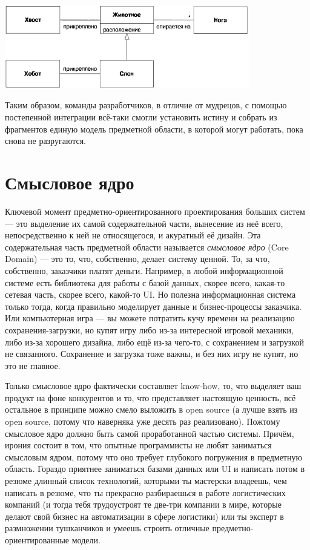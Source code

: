 \documentclass[a5paper]{article}
\begin{document}
\begin{center}
    \includegraphics[width=0.8\textwidth]{elephantSingleBoundedContext.png}
\end{center}

Таким образом, команды разработчиков, в отличие от мудрецов, с помощью постепенной интеграции всё-таки смогли установить истину и собрать из фрагментов единую модель предметной области, в которой могут работать, пока снова не разругаются.

\section{Смысловое ядро}

Ключевой момент предметно-ориентированного проектирования больших систем --- это выделение их самой содержательной части, вынесение из неё всего, непосредственно к ней не относящегося, и акуратный её дизайн. Эта содержательная часть предметной области называется \textit{смысловое ядро} (Core Domain) --- это то, что, собственно, делает систему ценной. То, за что, собственно, заказчики платят деньги. Например, в любой информационной системе есть библиотека для работы с базой данных, скорее всего, какая-то сетевая часть, скорее всего, какой-то UI. Но полезна информационная система только тогда, когда правильно моделирует данные и бизнес-процессы заказчика. Или компьютерная игра --- вы можете потратить кучу времени на реализацию сохранения-загрузки, но купят игру либо из-за интересной игровой механики, либо из-за хорошего дизайна, либо ещё из-за чего-то, с сохранением и загрузкой не связанного. Сохранение и загрузка тоже важны, и без них игру не купят, но это не главное.

Только смысловое ядро фактически составляет know-how, то, что выделяет ваш продукт на фоне конкурентов и то, что представляет настоящую ценность, всё остальное в принципе можно смело выложить в open source (а лучше взять из open source, потому что наверняка уже десять раз реализовано). Пожтому смысловое ядро должно быть самой проработанной частью системы. Причём, ирония состоит в том, что опытные программисты не любят заниматься смысловым ядром, потому что оно требует глубокого погружения в предметную область. Гораздо приятнее заниматься базами данных или UI и написать потом в резюме длинный список технологий, которыми ты мастерски владеешь, чем написать в резюме, что ты прекрасно разбираешься в работе логистических компаний (и тогда тебя трудоустроят те две-три компании в мире, которые делают свой бизнес на автоматизации в сфере логистики) или ты эксперт в размножении тушканчиков и умеешь строить отличные предметно-ориентированные модели.
\end{document}
